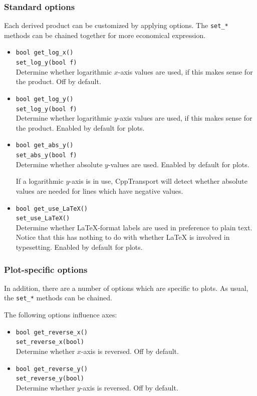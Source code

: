 \documentclass[11pt,a4paper]{article}
\newcommand{\packagefont}{\sffamily}
\newcommand{\CppTransport}{{\packagefont CppTransport}}
\newcommand{\semibold}[1]{{\fontseries{b}\selectfont{#1}}}
\newcommand{\para}[1]{\par\vspace{2mm}\noindent\semibold{{#1.}---}\ignorespaces}
\begin{document}
\subsubsection{Standard options}
\label{sec:product-standard-options}
Each derived product can be customized by applying options.
The \texttt{set_*} methods can be chained together for more
economical expression.
\begin{itemize}
	\item \texttt{bool get_log_x()} \\
	\texttt{set_log_y(bool f)} \\
	Determine whether logarithmic $x$-axis values are used, if this makes sense
	for the product. Off by default.
	
	\item \texttt{bool get_log_y()} \\
	\texttt{set_log_y(bool f)} \\
	Determine whether logarithmic $y$-axis values are used, if this makes sense
	for the product. Enabled by default for plots.
	
	\item \texttt{bool get_abs_y()} \\
	\texttt{set_abs_y(bool f)} \\
	Determine whether absolute $y$-values are used. Enabled by default for plots.
	
	If a logarithmic $y$-axis is in use, {\CppTransport} will detect whether
	absolute values are needed for lines which have negative values.
	
	\item \texttt{bool get_use_LaTeX()} \\
	\texttt{set_use_LaTeX()} \\
	\label{method:use_LaTeX}
	Determine whether {\LaTeX}-format labels are used
	in preference to plain text.
	Notice that this has nothing to do with whether {\LaTeX}
	is involved in typesetting. Enabled by default for plots.
\end{itemize}

\subsubsection{Plot-specific options}
In addition, there are a number of options which are specific to plots.
As usual, the \texttt{set_*} methods can be chained.

\para{Axis handling}
The following options influence axes:
\begin{itemize}
    \item \texttt{bool get_reverse_x()} \\
    \texttt{set_reverse_x(bool)} \\
    Determine whether $x$-axis is reversed. Off by default.
    
    \item \texttt{bool get_reverse_y()} \\
    \texttt{set_reverse_y(bool)} \\
    Determine whether $y$-axis is reversed. Off by default.
\end{itemize}
\end{document}
